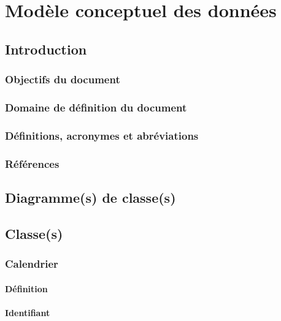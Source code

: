 \documentclass[a4paper, 11pt]{report}
\begin{document}

\tableofcontents

\chapter{Modèle conceptuel des données}

\section{Introduction}

\subsection{Objectifs du document}

\subsection{Domaine de définition du document}

\subsection{Définitions, acronymes et abréviations}

\subsection{Références}

\newpage
\section{Diagramme(s) de classe(s)}

\newpage
\section{Classe(s)}

\subsection{Calendrier}

\subsubsection{Définition}

\subsubsection{Identifiant}
\end{document}
